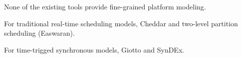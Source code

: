 
\label{section:related}

None of the existing tools provide fine-grained platform modeling.

For traditional real-time scheduling models, Cheddar and two-level partition
scheduling (Easwaran).

For time-trigged synchronous models, Giotto and SynDEx.


